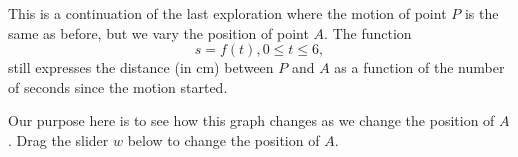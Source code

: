 \documentclass{ximera}
\begin{document}
\begin{exploration}\label{exp:Bugs2}
This is a continuation of the last exploration where the motion of point $P$ is the same as before, but we vary the position of point $A$. The function 
\[
   s=f(t), 0\leq t \leq 6 ,
\] 
still expresses the distance (in cm) between $P$ and $A$ as a function of the number of seconds since the motion started.

Our purpose here is to see how this graph changes as we change the position of $A$. Drag the slider $w$ below to change the position of $A$.

 
\begin{onlineOnly}
    \begin{center}
\end{center}
\end{onlineOnly}
\end{exploration}
\end{document}
